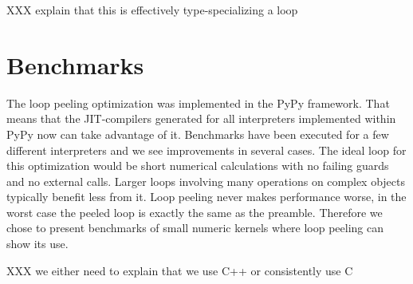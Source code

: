 \documentclass[preprint]{sigplanconf}
\begin{document}
XXX explain that this is effectively type-specializing a loop


\section{Benchmarks}

The loop peeling optimization was implemented in the PyPy
framework. That means that the JIT-compilers generated for all
interpreters implemented within PyPy now can take advantage of
it. Benchmarks have been executed for a few different interpreters and
we see improvements in several cases. The ideal loop for this optimization
would be short numerical calculations with no failing guards and no
external calls. Larger loops involving many operations on complex objects
typically benefit less from it. Loop peeling never makes performance worse, in
the worst case the peeled loop is exactly the same as the preamble. Therefore we
chose to present benchmarks of small numeric kernels where loop peeling can show
its use.

XXX we either need to explain that we use C++ or consistently use C
\end{document}
